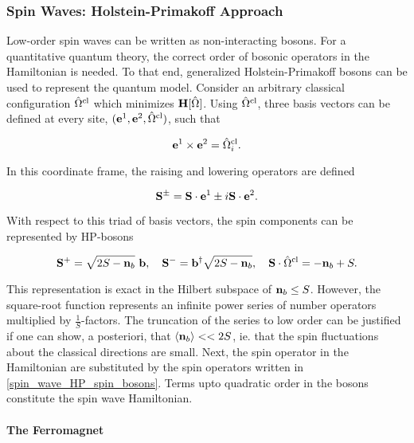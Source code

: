 \subsubsection{Spin Waves: Holstein-Primakoff Approach}

Low-order spin waves can be written as non-interacting bosons. For a quantitative quantum theory, the correct order of bosonic operators in the Hamiltonian is needed. To that end, generalized Holstein-Primakoff bosons can be used to represent the quantum model. Consider an arbitrary classical configuration $\hat{\Omega}^{\textnormal{cl}}$ which minimizes ${\bf H}[\hat{\Omega}]$. Using $\hat{\Omega}^{\textnormal{cl}}$, three basis vectors can be defined at every site, $({\bf e}^1, {\bf e}^2, \hat{\Omega}^{\textnormal{cl}})$, such that 

$$
    {\bf e}^1 \times {\bf e}^2 = \hat{\Omega}^{\textnormal{cl}}_i.
$$

In this coordinate frame, the raising and lowering operators are defined 

\begin{equation}
    {\bf S}^{\pm} = {\bf S} \cdot {\bf e}^1 \pm i {\bf S} \cdot {\bf e}^2.
\end{equation}

With respect to this triad of basis vectors, the spin components can be represented by HP-bosons 

\begin{equation}
    {\bf S}^+ = \sqrt{2S - {\bf n}_b} \textnormal{ }  {\bf b}, \quad {\bf S}^- = {\bf b}^\dagger \sqrt{2S - {\bf n}_b}, \quad {\bf S} \cdot \hat{\Omega}^{\textnormal{cl}} = -{\bf n}_b + S.
    \label{spin_wave_HP_spin_bosons}
\end{equation}

This representation is exact in the Hilbert subspace of ${\bf n}_b \leq S$. However, the square-root function represents an infinite power series of number operators multiplied by $\frac{1}{S}$-factors. The truncation of the series to low order can be justified if one can show, a posteriori, that $\langle {\bf n}_b \rangle << 2S$, ie. that the spin fluctuations about the classical directions are small. 
Next, the spin operator in the Hamiltonian are substituted by the spin operators written in \cref{spin_wave_HP_spin_bosons}. Terms upto quadratic order in the bosons constitute the spin wave Hamiltonian. \\

\paragraph{The Ferromagnet}

